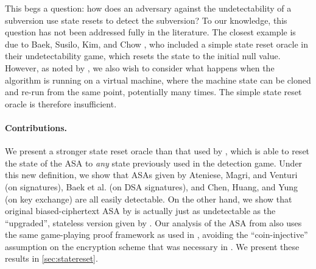 This begs a question: how does an adversary against the undetectability of a subversion use state resets to detect the subversion? To our knowledge, this question has not been addressed fully in the literature. The closest example is due to Baek, Susilo, Kim, and Chow \cite{BSKC2019}, who included a simple state reset oracle in their undetectability game, which resets the state to the initial null value. However, as noted by \cite{CCS:BelJaeKan15}, we also wish to consider what happens when the algorithm is running on a virtual machine, where the machine state can be cloned and re-run from the same point, potentially many times. The simple state reset oracle is therefore insufficient.

\paragraph{Contributions.}
We present a stronger state reset oracle than that used by \cite{BSKC2019}, which is able to reset the state of the ASA to \emph{any} state previously used in the detection game. Under this new definition, we show that ASAs given by Ateniese, Magri, and Venturi \cite{CCS:AteMagVen15} (on signatures), Baek et al. \cite{BSKC2019} (on DSA signatures), and Chen, Huang, and Yung \cite{AC:CheHuaYun20} (on key exchange) are all easily detectable. On the other hand, we show that original biased-ciphertext ASA by \cite{C:BelPatRog14} is actually just as undetectable as the ``upgraded'', stateless version given by \cite{CCS:BelJaeKan15}. Our analysis of the ASA from \cite{C:BelPatRog14} also uses the same game-playing proof framework as used in \cite{CCS:BelJaeKan15}, avoiding the ``coin-injective'' assumption on the encryption scheme that was necessary in \cite{C:BelPatRog14}. We present these results in \autoref{sec:statereset}.


